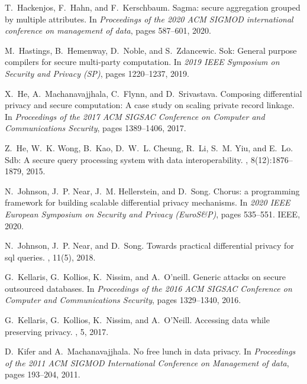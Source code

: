 \documentclass[11pt]{article}
\begin{document}
\begin{thebibliography}{140}
\begin{small}
T.~Hackenjos, F.~Hahn, and F.~Kerschbaum.
\newblock Sagma: secure aggregation grouped by multiple attributes.
\newblock In {\em Proceedings of the 2020 ACM SIGMOD international conference
  on management of data}, pages 587--601, 2020.

M.~Hastings, B.~Hemenway, D.~Noble, and S.~Zdancewic.
\newblock Sok: General purpose compilers for secure multi-party computation.
\newblock In {\em 2019 IEEE Symposium on Security and Privacy (SP)}, pages
  1220--1237, 2019.

X.~He, A.~Machanavajjhala, C.~Flynn, and D.~Srivastava.
\newblock Composing differential privacy and secure computation: A case study
  on scaling private record linkage.
\newblock In {\em Proceedings of the 2017 ACM SIGSAC Conference on Computer and
  Communications Security}, pages 1389--1406, 2017.

Z.~He, W.~K. Wong, B.~Kao, D.~W.~L. Cheung, R.~Li, S.~M. Yiu, and E.~Lo.
\newblock Sdb: A secure query processing system with data interoperability.
, 8(12):1876--1879, 2015.

N.~Johnson, J.~P. Near, J.~M. Hellerstein, and D.~Song.
\newblock Chorus: a programming framework for building scalable differential
  privacy mechanisms.
\newblock In {\em 2020 IEEE European Symposium on Security and Privacy
  (EuroS\&P)}, pages 535--551. IEEE, 2020.

N.~Johnson, J.~P. Near, and D.~Song.
\newblock Towards practical differential privacy for sql queries.
, 11(5), 2018.

G.~Kellaris, G.~Kollios, K.~Nissim, and A.~O'neill.
\newblock Generic attacks on secure outsourced databases.
\newblock In {\em Proceedings of the 2016 ACM SIGSAC Conference on Computer and
  Communications Security}, pages 1329--1340, 2016.

G.~Kellaris, G.~Kollios, K.~Nissim, and A.~O’Neill.
\newblock Accessing data while preserving privacy.
, 5, 2017.

D.~Kifer and A.~Machanavajjhala.
\newblock No free lunch in data privacy.
\newblock In {\em Proceedings of the 2011 ACM SIGMOD International Conference
  on Management of data}, pages 193--204, 2011.


\end{small}
\end{thebibliography}
\end{document}
